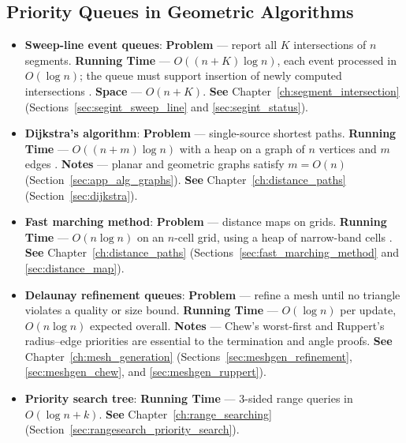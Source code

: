 \subsection{Priority Queues in Geometric Algorithms}
\label{sec:appalgs_pq_geometric}

\begin{itemize}
  \item \textbf{Sweep-line event queues}: \textbf{Problem} --- report all
    $K$ intersections of $n$ segments. \textbf{Running Time} ---
    $O((n+K)\log n)$, each event processed in $O(\log n)$; the queue must
    support insertion of newly computed intersections \cite{deberg2008}.
    \textbf{Space} --- $O(n+K)$. \textbf{See}
    Chapter~\ref{ch:segment_intersection} (Sections~\ref{sec:segint_sweep_line}
    and \ref{sec:segint_status}).
  \item \textbf{Dijkstra's algorithm}:
    \textbf{Problem} --- single-source shortest paths.
    \textbf{Running Time} --- $O((n+m)\log n)$ with a heap on a graph of
    $n$ vertices and $m$ edges \cite{dijkstra1959, cormen2009}.
    \textbf{Notes} --- planar and geometric graphs satisfy $m = O(n)$
    (Section~\ref{sec:app_alg_graphs}). \textbf{See}
    Chapter~\ref{ch:distance_paths} (Section~\ref{sec:dijkstra}).
  \item \textbf{Fast marching method}:
    \textbf{Problem} --- distance maps on grids. \textbf{Running Time} ---
    $O(n\log n)$ on an $n$-cell grid, using a heap of narrow-band cells
    \cite{sethian1996}. \textbf{See} Chapter~\ref{ch:distance_paths}
    (Sections~\ref{sec:fast_marching_method} and \ref{sec:distance_map}).
  \item \textbf{Delaunay refinement queues}: \textbf{Problem} --- refine a
    mesh until no triangle violates a quality or size bound.
    \textbf{Running Time} --- $O(\log n)$ per update, $O(n\log n)$ expected
    overall. \textbf{Notes} --- Chew's worst-first and Ruppert's
    radius--edge priorities are essential to the termination and angle
    proofs. \textbf{See} Chapter~\ref{ch:mesh_generation}
    (Sections~\ref{sec:meshgen_refinement}, \ref{sec:meshgen_chew}, and
    \ref{sec:meshgen_ruppert}).
  \item \textbf{Priority search tree}:
    \textbf{Running Time} --- 3-sided range queries in $O(\log n + k)$.
    \textbf{See} Chapter~\ref{ch:range_searching}
    (Section~\ref{sec:rangesearch_priority_search}).
\end{itemize}

